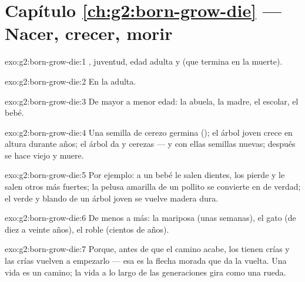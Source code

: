 \section*{Capítulo \ref{ch:g2:born-grow-die} --- Nacer, crecer, morir}

\begin{solution}{exo:g2:born-grow-die:1}
, juventud, edad adulta y  (que termina en la muerte).
\end{solution}

\begin{solution}{exo:g2:born-grow-die:2}
En la  adulta.
\end{solution}

\begin{solution}{exo:g2:born-grow-die:3}
De mayor a menor edad: la abuela, la madre, el escolar, el bebé.
\end{solution}

\begin{solution}{exo:g2:born-grow-die:4}
Una semilla de cerezo germina (); el árbol joven crece en
altura durante años; el árbol  da  y cerezas --- y con
ellas semillas nuevas; después se hace viejo y muere.
\end{solution}

\begin{solution}{exo:g2:born-grow-die:5}
Por ejemplo: a un bebé le salen dientes, los pierde y le salen otros
más fuertes; la pelusa amarilla de un pollito se convierte en 
de verdad; el  verde y blando de un árbol joven se vuelve madera dura.
\end{solution}

\begin{solution}{exo:g2:born-grow-die:6}
De menos a más: la mariposa (unas semanas), el gato (de diez a veinte
años), el roble (cientos de años).
\end{solution}

\begin{solution}{exo:g2:born-grow-die:7}
Porque, antes de que el camino acabe, los  tienen crías y las
crías vuelven a empezarlo --- esa es la flecha morada que da la vuelta.
Una vida es un camino; la vida a lo largo de las generaciones gira
como una rueda.
\end{solution}

